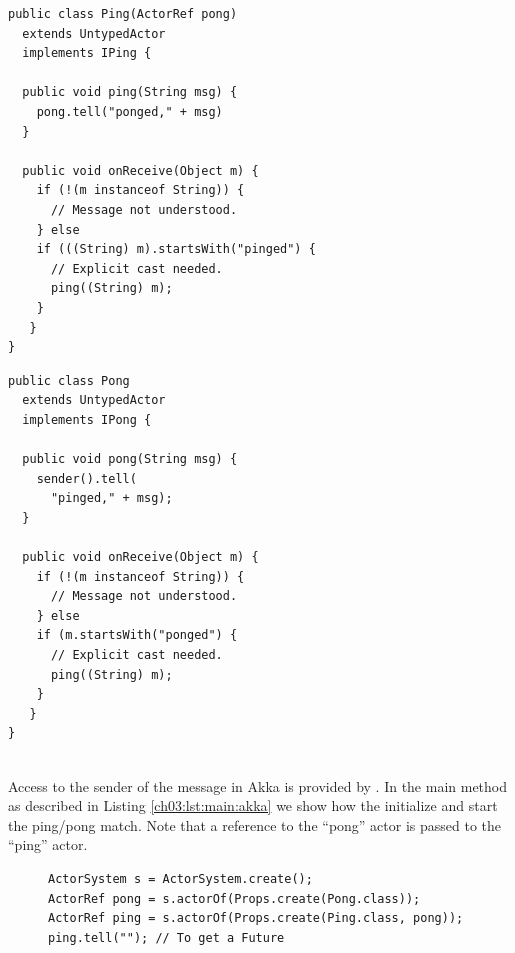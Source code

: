 \lstset{language=Java}
\begin{center}
\begin{minipage}[t]{0.48\textwidth}
\begin{lstlisting}[caption=Ping actor in Akka,label=lst:ping:akka]
public class Ping(ActorRef pong)
  extends UntypedActor 
  implements IPing {

  public void ping(String msg) {
    pong.tell("ponged," + msg)
  }

  public void onReceive(Object m) {
    if (!(m instanceof String)) {
      // Message not understood.
    } else 
    if (((String) m).startsWith("pinged") {
      // Explicit cast needed.
      ping((String) m);
    } 
   }
}
\end{lstlisting}
\end{minipage}
\hfill
\begin{minipage}[t]{0.48\textwidth}
\begin{lstlisting}[caption=Pong class in Akka,label=lst:pong:akka]
public class Pong 
  extends UntypedActor 
  implements IPong {

  public void pong(String msg) {
    sender().tell(
      "pinged," + msg); 
  }

  public void onReceive(Object m) {
    if (!(m instanceof String)) {
      // Message not understood.
    } else 
    if (m.startsWith("ponged") {
      // Explicit cast needed.
      ping((String) m);
    } 
   }
}
 
\end{lstlisting}
\end{minipage}
\end{center}

Access to the sender of the message in Akka is provided by .
In the main method as described in Listing \ref{ch03:lst:main:akka} we show how the initialize and start the ping/pong match.
Note that a reference to the ``pong'' actor is passed to the ``ping'' actor.

\begin{figure}[h]
\begin{lstlisting}[caption=main in Akka,label=lst:main:akka]
ActorSystem s = ActorSystem.create();
ActorRef pong = s.actorOf(Props.create(Pong.class));
ActorRef ping = s.actorOf(Props.create(Ping.class, pong));
ping.tell(""); // To get a Future
\end{lstlisting}
\end{figure}


